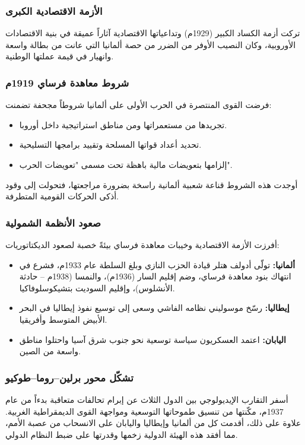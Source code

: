\documentclass[12pt, a4paper]{article}
\begin{document}
\subsubsection{الأزمة الاقتصادية الكبرى}
تركت أزمة الكساد الكبير (1929م) وتداعياتها الاقتصادية آثاراً عميقة في بنية الاقتصادات
الأوروبية، وكان النصيب الأوفر من الضرر من حصة ألمانيا التي عانت من بطالة واسعة
وانهيار في قيمة عملتها الوطنية.

\subsubsection{شروط معاهدة فرساي 1919م}
فرضت القوى المنتصرة في الحرب الأولى على ألمانيا شروطاً مجحفة تضمنت:
\begin{itemize}[leftmargin=*, itemsep=2pt]
  \item تجريدها من مستعمراتها ومن مناطق استراتيجية داخل أوروبا.
  \item تحديد أعداد قواتها المسلحة وتقييد برامجها التسليحية.
  \item إلزامها بتعويضات مالية باهظة تحت مسمى "تعويضات الحرب".
\end{itemize}
أوجدت هذه الشروط قناعة شعبية ألمانية راسخة بضرورة مراجعتها، فتحولت إلى وقود
أذكى الحركات القومية المتطرفة.

\subsubsection{صعود الأنظمة الشمولية}
أفرزت الأزمة الاقتصادية وخيبات معاهدة فرساي بيئةً خصبة لصعود الديكتاتوريات:
\begin{itemize}[leftmargin=*, itemsep=2pt]
  \item \textbf{ألمانيا:} تولّى أدولف هتلر قيادة الحزب النازي وبلغ السلطة عام 1933م،
        فشرع في انتهاك بنود معاهدة فرساي، وضم إقليم السار (1936م)،
        والنمسا (1938م – حادثة الأنشلوس)، وإقليم السوديت بتشيكوسلوفاكيا.
  \item \textbf{إيطاليا:} رسّخ موسوليني نظامه الفاشي وسعى إلى توسيع نفوذ إيطاليا
        في البحر الأبيض المتوسط وأفريقيا.
  \item \textbf{اليابان:} اعتمد العسكريون سياسة توسعية نحو جنوب شرق آسيا
        واحتلوا مناطق واسعة من الصين.
\end{itemize}

\subsubsection{تشكّل محور برلين–روما–طوكيو}
أسفر التقارب الإيديولوجي بين الدول الثلاث عن إبرام تحالفات متعاقبة بدءاً من عام
1937م، مكّنتها من تنسيق طموحاتها التوسعية ومواجهة القوى الديمقراطية الغربية.
علاوة على ذلك، أقدمت كل من ألمانيا وإيطاليا واليابان على الانسحاب من عصبة الأمم،
مما أفقد هذه الهيئة الدولية زخمها وقدرتها على ضبط النظام الدولي.
\end{document}
